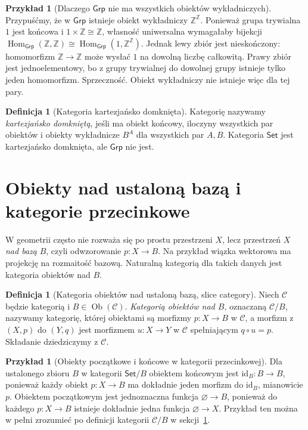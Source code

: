 \documentclass[11pt,a4paper]{article}
\numberwithin{equation}{section}
\theoremstyle{plain}
\theoremstyle{definition}
\newtheorem{definicja}[twierdzenie]{Definicja}
\newtheorem{przyklad}[twierdzenie]{Przykład}
\theoremstyle{remark}
\newcommand{\cat}[1]{\mathsf{#1}}
\newcommand{\Set}{\cat{Set}}
\newcommand{\Grp}{\cat{Grp}}
\newcommand{\id}{\mathrm{id}}
\newcommand{\Hom}{\operatorname{Hom}}
\newcommand{\Ob}{\operatorname{Ob}}
\begin{document}
\begin{przyklad}[Dlaczego $\Grp$ nie ma wszystkich obiektów wykładniczych]
Przypuśćmy, że w $\Grp$ istnieje obiekt wykładniczy $\mathbb Z^{\mathbb Z}$. Ponieważ grupa trywialna $1$ jest końcowa i $1\times\mathbb Z\cong\mathbb Z$, własność uniwersalna wymagałaby bijekcji
$\Hom_{\Grp}(\mathbb Z,\mathbb Z)\cong\Hom_{\Grp}(1,\mathbb Z^{\mathbb Z})$.
Jednak lewy zbiór jest nieskończony: homomorfizm $\mathbb Z\to\mathbb Z$ może wysłać $1$ na dowolną liczbę całkowitą. Prawy zbiór jest jednoelementowy, bo z grupy trywialnej do dowolnej grupy istnieje tylko jeden homomorfizm. Sprzeczność. Obiekt wykładniczy nie istnieje więc dla tej pary.
\end{przyklad}

\begin{definicja}[Kategoria kartezjańsko domknięta]
Kategorię nazywamy \emph{kartezjańsko domkniętą}, jeśli ma obiekt końcowy, iloczyny wszystkich par obiektów i obiekty wykładnicze $B^A$ dla wszystkich par $A,B$. Kategoria $\Set$ jest kartezjańsko domknięta, ale $\Grp$ nie jest.
\end{definicja}

\section{Obiekty nad ustaloną bazą i kategorie przecinkowe}\label{sec:slice}

W geometrii często nie rozważa się po prostu przestrzeni $X$, lecz przestrzeń $X$ \emph{nad bazą} $B$, czyli odwzorowanie $p:X\to B$. Na przykład wiązka wektorowa ma projekcję na rozmaitość bazową. Naturalną kategorią dla takich danych jest kategoria obiektów nad $B$.

\begin{definicja}[Kategoria obiektów nad ustaloną bazą, slice category]\label{def:slice}
Niech $\mathcal C$ będzie kategorią i $B\in\Ob(\mathcal C)$. \emph{Kategorią obiektów nad $B$}, oznaczaną $\mathcal C/B$, nazywamy kategorię, której obiektami są morfizmy $p:X\to B$ w $\mathcal C$, a morfizm z $(X,p)$ do $(Y,q)$ jest morfizmem $u:X\to Y$ w $\mathcal C$ spełniającym $q\circ u=p$. Składanie dziedziczymy z $\mathcal C$.
\end{definicja}

\begin{przyklad}[Obiekty początkowe i końcowe w kategorii przecinkowej]
Dla ustalonego zbioru $B$ w kategorii $\Set/B$ obiektem końcowym jest $\id_B:B\to B$, ponieważ każdy obiekt $p:X\to B$ ma dokładnie jeden morfizm do $\id_B$, mianowicie $p$. Obiektem początkowym jest jednoznaczna funkcja $\varnothing\to B$, ponieważ do każdego $p:X\to B$ istnieje dokładnie jedna funkcja $\varnothing\to X$. Przykład ten można w pełni zrozumieć po definicji kategorii $\mathcal C/B$ w sekcji~\ref{sec:slice}.
\end{przyklad}
\end{document}
